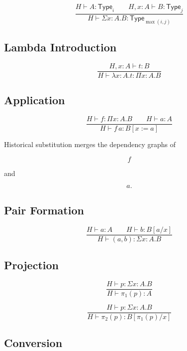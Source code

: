 \documentclass[12pt,oneside]{article}
\theoremstyle{definition}
\theoremstyle{remark}
\newcommand{\Type}{\mathsf{Type}}
\begin{document}
\[
\frac{
H
\vdash
A
:
\Type_i
\qquad
H,
x:A
\vdash
B
:
\Type_j
}{
H
\vdash
\Sigma
x:A.
B
:
\Type_{\max(i,j)}
}
\]


\subsection{Lambda Introduction}

\[
\frac{
H,
x:A
\vdash
t
:
B
}{
H
\vdash
\lambda
x:A.
t
:
\Pi
x:A.
B
}
\]


\subsection{Application}

\[
\frac{
H
\vdash
f
:
\Pi
x:A.
B
\qquad
H
\vdash
a
:
A
}{
H
\vdash
f\,a
:
B[x:=a]
}
\]

Historical substitution merges the dependency graphs of

\[
f
\]

and

\[
a.
\]


\subsection{Pair Formation}

\[
\frac{
H
\vdash
a
:
A
\qquad
H
\vdash
b
:
B[a/x]
}{
H
\vdash
(a,b)
:
\Sigma
x:A.
B
}
\]


\subsection{Projection}

\[
\frac{
H
\vdash
p
:
\Sigma
x:A.
B
}{
H
\vdash
\pi_1(p)
:
A
}
\]

\[
\frac{
H
\vdash
p
:
\Sigma
x:A.
B
}{
H
\vdash
\pi_2(p)
:
B[\pi_1(p)/x]
}
\]


\subsection{Conversion}
\end{document}
